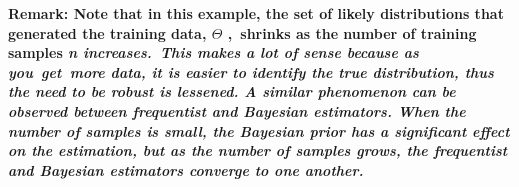 \documentclass[12pt,twoside]{article}
\begin{document}
\vspace{\baselineskip}
\begin{adjustwidth}{0.08in}{0.58in}
{\fontsize{10pt}{12.0pt}\selectfont \textbf{Remark: Note that in this example, the set of likely distributions that generated the training data, $ \Theta $ ,\ shrinks as the number of training samples  \textit{n increases.\  This makes a lot of sense because as you\  get\  more data, it is easier to identify the true distribution, thus the need to be robust is lessened. A similar phenomenon can be observed between frequentist and Bayesian estimators. When the number of samples is small, the Bayesian prior has a significant effect on the estimation, but as the number of samples grows, the frequentist and Bayesian estimators converge to one another.}}\par}\par

\end{adjustwidth}


\printbibliography
\end{document}
